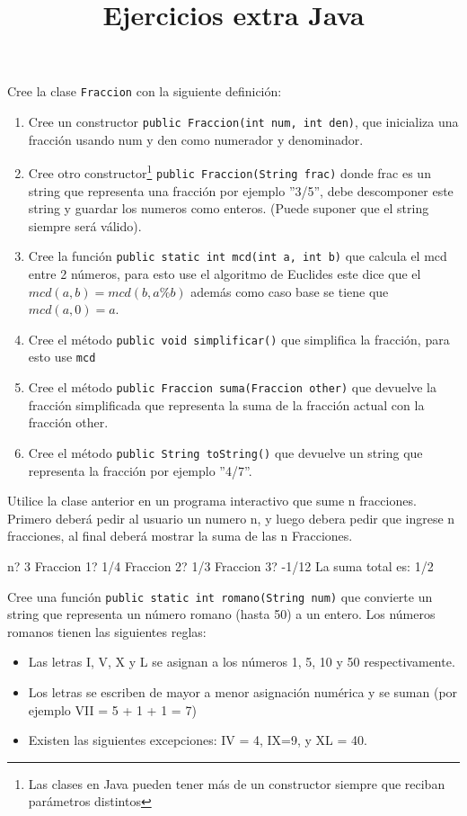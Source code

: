 \documentclass[dcc]{fcfmcourse}
\title{Ejercicios extra Java}
\newenvironment{codebox} {\small \ttfamily \obeylines \begingroup \setstretch{-2.4}} {\endgroup}
\begin{document}
\maketitle

\vspace{-5ex}
\begin{problems}
\problem Cree la clase \texttt{Fraccion} con la siguiente definición:

\begin{enumerate}
\item Cree un constructor \texttt{public Fraccion(int num, int den)}, que inicializa una fracción usando num y den como numerador y denominador.
\item Cree otro constructor\footnote{Las clases en Java pueden tener más de un constructor siempre que reciban parámetros distintos} \texttt{public Fraccion(String frac)} donde frac es un string que representa una fracción por ejemplo ''3/5'', debe descomponer este string y guardar los numeros como enteros. (Puede suponer que el string siempre será válido).
\item Cree la función \texttt{public static int mcd(int a, int b)} que calcula el mcd entre 2 números, para esto use el algoritmo de Euclides este dice que el $mcd(a,b)=mcd(b,a\%b)$ además como caso base se tiene que $mcd(a,0)=a$.
\item Cree el método \texttt{public void simplificar()} que simplifica la fracción, para esto use \texttt{mcd}
\item Cree el método \texttt{public Fraccion suma(Fraccion other)} que devuelve la fracción simplificada que representa la suma de la fracción actual con la fracción other.
\item Cree el método \texttt{public String toString()} que devuelve un string que representa la fracción por ejemplo ''4/7''.
\end{enumerate}

Utilice la clase anterior en un programa interactivo que sume n fracciones. Primero deberá pedir al usuario un numero n, y luego debera pedir que ingrese n fracciones, al final deberá mostrar la suma de las n Fracciones.

\begin{codebox}
n?
3
Fraccion 1?
1/4
Fraccion 2?
1/3
Fraccion 3?
-1/12
La suma total es: 1/2
\end{codebox}

\problem Cree una función \texttt{public static int romano(String num)} que convierte un string que representa un número romano (hasta 50) a un entero. Los números romanos tienen las siguientes reglas:
\begin{itemize}
	\item Las letras I, V, X y L se asignan a los números 1, 5, 10 y 50 respectivamente.
	\item Los letras se escriben de mayor a menor asignación numérica y se suman (por ejemplo VII = 5 + 1 + 1 = 7)
	\item Existen las siguientes excepciones: IV = 4, IX=9, y XL = 40.
\end{itemize}

\end{problems}
\end{document}
